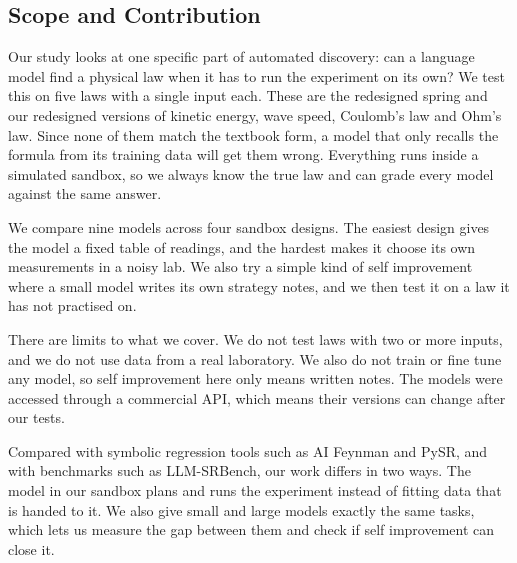 \subsection{Scope and Contribution}

Our study looks at one specific part of automated discovery: can a language model find a physical law when it has to run the experiment on its own? We test this on five laws with a single input each. These are the redesigned spring and our redesigned versions of kinetic energy, wave speed, Coulomb's law and Ohm's law. Since none of them match the textbook form, a model that only recalls the formula from its training data will get them wrong. Everything runs inside a simulated sandbox, so we always know the true law and can grade every model against the same answer.

We compare nine models across four sandbox designs. The easiest design gives the model a fixed table of readings, and the hardest makes it choose its own measurements in a noisy lab. We also try a simple kind of self improvement where a small model writes its own strategy notes, and we then test it on a law it has not practised on.

There are limits to what we cover. We do not test laws with two or more inputs, and we do not use data from a real laboratory. We also do not train or fine tune any model, so self improvement here only means written notes. The models were accessed through a commercial API, which means their versions can change after our tests.

Compared with symbolic regression tools such as AI Feynman and PySR, and with benchmarks such as LLM-SRBench, our work differs in two ways. The model in our sandbox plans and runs the experiment instead of fitting data that is handed to it. We also give small and large models exactly the same tasks, which lets us measure the gap between them and check if self improvement can close it.
